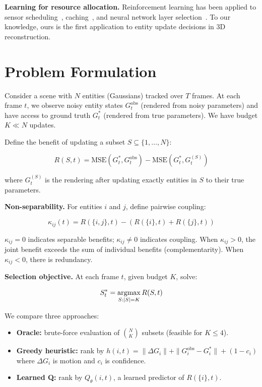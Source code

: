 \documentclass[10pt,twocolumn]{article}
\newcommand{\argmax}{\operatornamewithlimits{argmax}}
\begin{document}
\textbf{Learning for resource allocation.} Reinforcement learning has been applied to sensor scheduling~\cite{leong2020deep}, caching~\cite{sadeghi2019deep}, and neural network layer selection~\cite{wu2018blockdrop}. To our knowledge, ours is the first application to entity update decisions in 3D reconstruction.

\section{Problem Formulation}

Consider a scene with $N$ entities (Gaussians) tracked over $T$ frames. At each frame $t$, we observe noisy entity states $G_t^{\text{obs}}$ (rendered from noisy parameters) and have access to ground truth $G_t^*$ (rendered from true parameters). We have budget $K \ll N$ updates.

Define the benefit of updating a subset $S \subseteq \{1,\ldots,N\}$:

\begin{equation}
R(S, t) = \text{MSE}(G_t^*, G_t^{\text{obs}}) - \text{MSE}(G_t^*, G_t^{(S)})
\end{equation}

where $G_t^{(S)}$ is the rendering after updating exactly entities in $S$ to their true parameters.

\textbf{Non-separability.} For entities $i$ and $j$, define pairwise coupling:

\begin{equation}
\kappa_{ij}(t) = R(\{i,j\}, t) - (R(\{i\}, t) + R(\{j\}, t))
\end{equation}

$\kappa_{ij} = 0$ indicates separable benefits; $\kappa_{ij} \neq 0$ indicates coupling. When $\kappa_{ij} > 0$, the joint benefit exceeds the sum of individual benefits (complementarity). When $\kappa_{ij} < 0$, there is redundancy.

\textbf{Selection objective.} At each frame $t$, given budget $K$, solve:

\begin{equation}
S_t^* = \argmax_{S: |S| = K} R(S, t)
\end{equation}

We compare three approaches:
\begin{itemize}
    \item \textbf{Oracle:} brute-force evaluation of $\binom{N}{K}$ subsets (feasible for $K \leq 4$).
    \item \textbf{Greedy heuristic:} rank by $h(i,t) = \|\Delta G_i\| + \|G_i^{\text{obs}} - G_i^*\| + (1 - c_i)$ where $\Delta G_i$ is motion and $c_i$ is confidence.
    \item \textbf{Learned Q:} rank by $Q_\theta(i,t)$, a learned predictor of $R(\{i\}, t)$.
\end{itemize}
\end{document}
